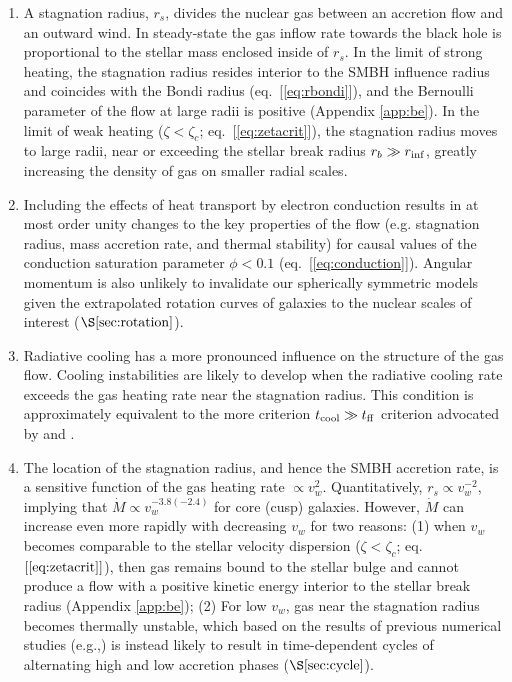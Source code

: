 \documentclass[usenatbib,fleqn]{mn2e}
\newcommand{\Mdot}{\dot{M}}
\newcommand{\rs}{r_s}
\begin{document}
  \begin{enumerate}
  \item A stagnation radius, $\rs$, divides the nuclear gas between an accretion flow and an
    outward wind. In steady-state the gas inflow rate towards the black hole is proportional to the
    stellar mass enclosed inside of $\rs$.  In the limit of strong heating, the stagnation radius resides interior to the SMBH influence radius and coincides with the Bondi radius (eq.~[\ref{eq:rbondi}]), and the Bernoulli parameter of the flow at large radii is positive (Appendix \ref{app:be}).  In the limit of weak heating ($\zeta < \zeta_c$; eq.~[\ref{eq:zetacrit}]), the stagnation radius moves to large radii, near or exceeding the stellar break radius $r_b \gg r_{\rm inf}$, greatly increasing the density of gas on smaller radial scales.  

\item Including the effects of heat transport by electron conduction results in at most order unity changes to the key properties of the flow (e.g. stagnation radius, mass accretion rate, and thermal stability) for causal values of the conduction saturation parameter $\phi < 0.1$ (eq.~[\ref{eq:conduction}]).  Angular momentum is also unlikely to invalidate our spherically symmetric models given the extrapolated rotation curves of galaxies to the nuclear scales of interest ($\S\ref{sec:rotation}$).

\item Radiative cooling has a more pronounced influence on the structure of the gas flow.  Cooling instabilities are likely to develop when the radiative cooling rate exceeds the gas heating rate near the stagnation radius.  This condition is approximately equivalent to the more criterion $t_{\rm cool} \gg t_{\rm ff}$ criterion advocated by \citet{McCourt+12} and \citet{Li&Bryan14a}.   

  \item The location of the stagnation radius, and hence the SMBH accretion rate, is a sensitive function of the gas heating rate $\propto v_w^{2}$.  Quantitatively, $\rs\propto v_w^{-2}$, implying that $\Mdot\propto  v_w^{-3.8 (-2.4)}$ for core (cusp) galaxies.  However, $\Mdot$ can increase even more rapidly with decreasing $v_w$ for two reasons: (1) when $v_w$ becomes comparable to the stellar velocity dispersion ($\zeta < \zeta_c$; eq.~$[\ref{eq:zetacrit}]$), then gas remains bound to the stellar bulge and cannot produce a flow with a positive kinetic energy interior to the stellar break radius (Appendix \ref{app:be}); (2) For low $v_w$, gas near the stagnation radius becomes thermally unstable, which based on the results of previous numerical studies (e.g.,\citealt{Ciotti+10}) is instead likely to result in time-dependent cycles of alternating high and low accretion phases ($\S\ref{sec:cycle}$).


\end{enumerate}
\end{document}
